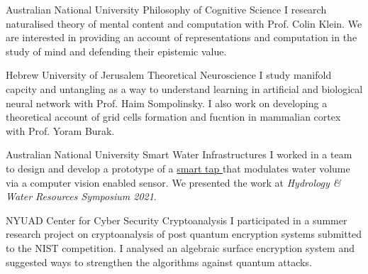 {Australian National University}
{Philosophy of Cognitive Science}
{
	I research naturalised theory of mental content and computation with Prof. Colin Klein. We are interested in providing an account of representations and computation in the study of mind and defending their epistemic value.
}

{Hebrew University of Jerusalem}
{Theoretical Neuroscience}
{
	I study manifold capcity and untangling as a way to understand learning in artificial and biological neural network with Prof. Haim Sompolinsky. I also work on developing a theoretical account of grid cells formation and fucntion in mammalian cortex with Prof. Yoram Burak.  
}

{Australian National University}
{Smart Water Infrastructures}
{
	I worked in a team to design and develop a prototype of a 
	\href{http://tappyvision.herokuapp.com}{
		smart tap
	} that modulates water volume via a computer vision enabled sensor. We presented the work at \textit{Hydrology \& Water Resources Symposium 2021}.
}

{NYUAD Center for Cyber Security}
{Cryptoanalysis}
{
	I participated in a summer research project on cryptoanalysis of post quantum encryption systems submitted to the NIST competition. I analysed an algebraic surface encryption system and suggested ways to strengthen the algorithms against quantum attacks.
}